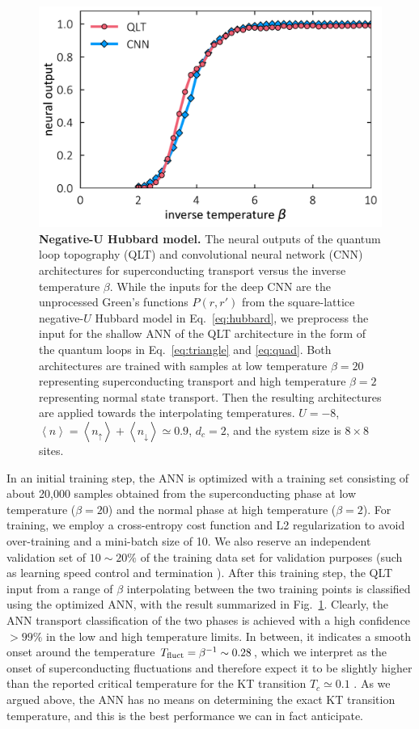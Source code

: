 \documentclass[amsmath,amssymb, aps, prx, longbibliography, twocolumn]{revtex4-1}
\begin{document}
\begin{figure}[t]
\includegraphics[scale=.43]{fig1.pdf}
\caption{
{\bf Negative-U Hubbard model.} The neural outputs of the quantum loop topography (QLT) and convolutional neural network (CNN) architectures for superconducting transport versus the inverse temperature $\beta$. While the inputs for the deep CNN are the unprocessed Green's functions $P(r,r')$ from the square-lattice negative-$U$ Hubbard model in Eq.~\eqref{eq:hubbard}, 
we preprocess the input for the shallow ANN of the QLT architecture in the form of the quantum loops in Eq.~\eqref{eq:triangle} and \ref{eq:quad}. Both architectures are trained with samples at low temperature $\beta=20$ representing superconducting transport and high temperature $\beta=2$ representing normal state transport. Then the resulting architectures are applied towards the interpolating temperatures. $U=-8$, $\left\langle n\right\rangle= \left\langle n_\uparrow\right\rangle+\left\langle n_\downarrow\right\rangle\simeq 0.9$, $d_c=2$, and the system size is $8\times 8$ sites. }\label{fig:hubbard}
\end{figure}


In an initial training step, the ANN is optimized with a training set consisting of about 20,000 samples obtained from the superconducting phase at low temperature ($\beta=20$) and the normal phase at high temperature ($\beta=2$). 
For training, we employ a cross-entropy cost function and L2 regularization to avoid over-training and a mini-batch size of 10. We also reserve an independent validation set of $10\sim 20\%$ of the training data set for validation purposes (such as learning speed control and termination \cite{MLbook}).
After this training step, the QLT input from a range of $\beta$ interpolating between the two training points is classified using the optimized ANN, with the result summarized in Fig.~\ref{fig:hubbard}. 
Clearly, the ANN transport classification of the two phases is achieved with a high confidence  $>99\%$ in the low and high temperature limits. In between, it indicates a smooth onset around the temperature $T_{\rm fluct}=\beta^{-1} \sim 0.28$, which we interpret as the onset of superconducting fluctuations and therefore expect it to be slightly higher than the reported critical temperature for the KT transition $T_c\simeq 0.1$ \cite{Scalettar1989, Scalapino1993}. As we argued above, the ANN has no means on determining the exact KT transition temperature, and this is the best performance we can in fact anticipate. 
\end{document}

